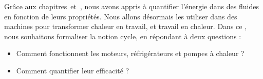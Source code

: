 Grâce aux chapitres~\quatre et~\cinq, nous avons appris à quantifier l’énergie dans des fluides en fonction de leurs propriétés. Nous allons désormais les utiliser dans des machines pour transformer chaleur en travail, et travail en chaleur. Dans ce \courssix, nous souhaitons formaliser la notion cycle, en répondant à deux questions :
\begin{itemize}
	\item Comment fonctionnent les moteurs, réfrigérateurs et pompes à chaleur ?
	\item Comment quantifier leur efficacité ?
\end{itemize}
